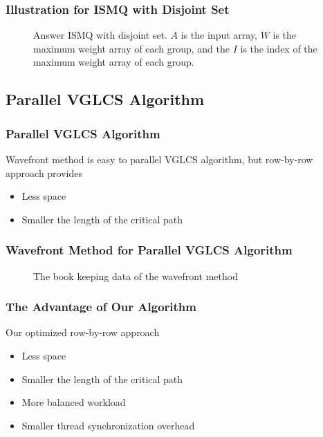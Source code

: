 \begin{withoutheadline}
\begin{frame}
	\frametitle{Illustration for ISMQ with Disjoint Set}
	\begin{figure}[!thb]
		\centering {} 
		\caption{Answer ISMQ with disjoint set. $A$ is the input array,
			$W$ is the maximum weight array of each group, and the $I$
			is the index of the maximum weight array of each group. }
	\end{figure}
\end{frame}
\end{withoutheadline}

\subsection{Parallel VGLCS Algorithm}
\begin{frame}
    \frametitle{Parallel VGLCS Algorithm}
	Wavefront method is easy to parallel VGLCS algorithm, but row-by-row
	approach provides

    \begin{itemize}
    	\setlength\itemsep{1em}
		\item 
			Less space
		\item 
			Smaller the length of the critical path
    \end{itemize}
\end{frame}

\begin{withoutheadline}
\begin{frame}
	\frametitle{Wavefront Method for Parallel VGLCS Algorithm}
	\begin{figure}[!thb]
	  \centering {} 
	  \caption{The book keeping data of the wavefront method}
	  \label{fig:fig-VGLCS-dp-wavefront}
	\end{figure}
\end{frame}
\end{withoutheadline}

\begin{frame}
	\frametitle{The Advantage of Our Algorithm}
	Our optimized row-by-row approach
	\begin{itemize}
		\setlength\itemsep{1em}
		\item 
			Less space
		\item 
			Smaller the length of the critical path
		\item 
			More balanced workload
		\item 
			Smaller thread synchronization overhead
	\end{itemize}
\end{frame}

